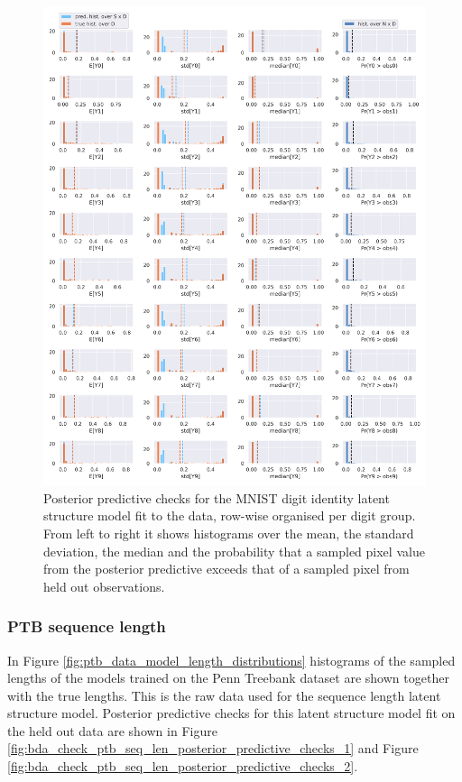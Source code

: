 \begin{figure}[h!]
    \centering
    \includegraphics[width=\textwidth]{images/bda_checks/mnist/posterior_predictive_checks.png}
    \caption{Posterior predictive checks for the MNIST digit identity latent structure model fit to the data, row-wise organised per digit group. From left to right it shows histograms over the mean, the standard deviation, the median and the probability that a sampled pixel value from the posterior predictive exceeds that of a sampled pixel from held out observations.}
    \label{fig:bda_check_mnist_posterior_predictive_checks}
\end{figure}

\subsubsection{PTB sequence length}

In Figure \ref{fig:ptb_data_model_length_distributions} histograms of the sampled lengths of the models trained on the Penn Treebank dataset are shown together with the true lengths. This is the raw data used for the sequence length latent structure model. Posterior predictive checks for this latent structure model fit on the held out data are shown in Figure \ref{fig:bda_check_ptb_seq_len_posterior_predictive_checks_1} and Figure  \ref{fig:bda_check_ptb_seq_len_posterior_predictive_checks_2}.

